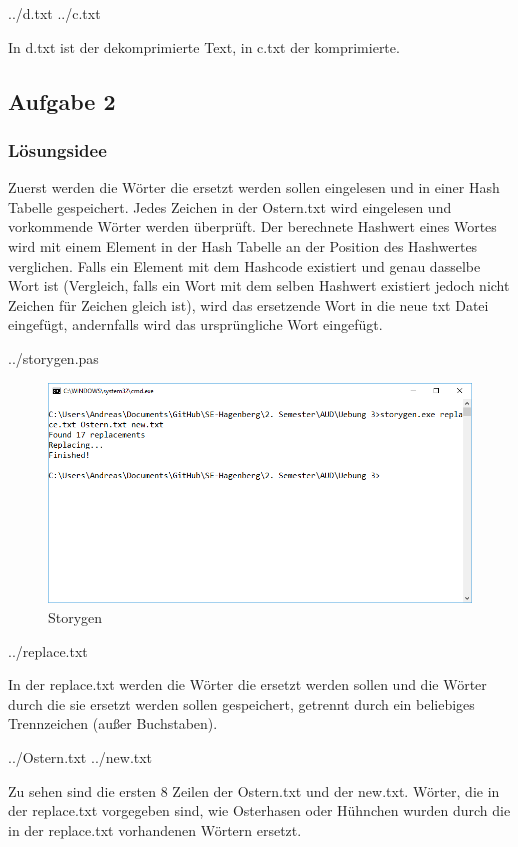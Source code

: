 \documentclass[a4papr,12pt]{article}
\begin{document}
 {../d.txt}
 {../c.txt}

In d.txt ist der dekomprimierte Text, in c.txt der komprimierte.

\newpage
\subsection*{Aufgabe 2}
\subsubsection*{Lösungsidee}
Zuerst werden die Wörter die ersetzt werden sollen eingelesen und in einer Hash Tabelle gespeichert. Jedes Zeichen in der Ostern.txt wird eingelesen und vorkommende Wörter werden überprüft. Der berechnete Hashwert eines Wortes wird mit einem Element in der Hash Tabelle an der Position des Hashwertes verglichen. Falls ein Element mit dem Hashcode existiert und genau dasselbe Wort ist (Vergleich, falls ein Wort mit dem selben Hashwert existiert jedoch nicht Zeichen für Zeichen gleich ist), wird das ersetzende Wort in die neue txt Datei eingefügt, andernfalls wird das ursprüngliche Wort eingefügt.   
\newline

 {../storygen.pas}
\begin{figure}[H]
	\centering
	\includegraphics[scale=0.75]{./pictures/2.png}
	\caption{Storygen}
	\label{fig: Matching}
\end{figure}
\newpage
 {../replace.txt}
\raggedright
In der replace.txt werden die Wörter die ersetzt werden sollen und die Wörter durch die sie ersetzt werden sollen gespeichert, getrennt durch ein beliebiges Trennzeichen (außer Buchstaben).
\newline

 {../Ostern.txt}
 {../new.txt}
\raggedright
Zu sehen sind die ersten 8 Zeilen der Ostern.txt und der new.txt. Wörter, die in der replace.txt vorgegeben sind, wie Osterhasen oder Hühnchen wurden durch die in der replace.txt vorhandenen Wörtern ersetzt.
\end{document}
